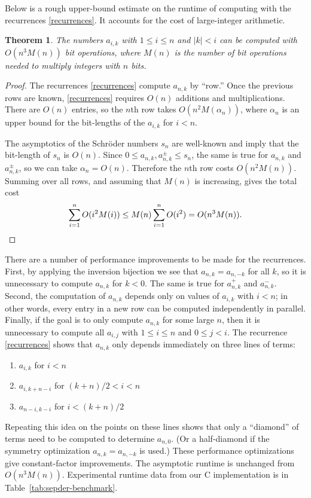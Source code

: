 \documentclass{article}
\theoremstyle{plain}
\newtheorem{theorem}{Theorem}
\theoremstyle{definition}
\theoremstyle{plain}
\begin{document}
Below is a rough upper-bound estimate on the runtime of computing with the
recurrences \eqref{recurrences}. It accounts for the cost of large-integer
arithmetic.

\begin{theorem}
    The numbers $a_{i, k}$ with $1 \leq i \leq n$ and $|k| < i$ can be computed
    with $O(n^3 M(n))$ bit operations, where $M(n)$ is the number of bit
    operations needed to multiply integers with $n$ bits.
\end{theorem}

\begin{proof}
    The recurrences \eqref{recurrences} compute $a_{n, k}$ by ``row.'' Once the
    previous rows are known, \eqref{recurrences} requires $O(n)$ additions and
    multiplications. There are $O(n)$ entries, so the $n$th row takes $O(n^2
    M(\alpha_n))$, where $\alpha_n$ is an upper bound for the
    bit-lengths of the $a_{i, k}$ for $i < n$.

    The asymptotics of the Schr\"oder numbers $s_n$ are well-known
    \cite{OEISA6318} and imply that the bit-length of $s_n$ is $O(n)$. Since $0
    \leq a_{n, k}, a^\pm_{n, k} \leq s_n$, the same is true for $a_{n, k}$ and
    $a^\pm_{n, k}$, so we can take $\alpha_n = O(n)$. Therefore the $n$th row
    costs $O(n^2 M(n))$. Summing over all rows, and assuming that $M(n)$ is
    increasing, gives the total cost
    \begin{equation*}
        \sum_{i = 1}^n O(i^2 M(i)) \leq M(n) \sum_{i = 1}^n O(i^2) = O(n^3 M(n)). \qedhere
    \end{equation*}
\end{proof}

There are a number of performance improvements to be made for the recurrences.
First, by applying the inversion bijection we see that $a_{n, k} = a_{n, -k}$ for all $k$, so it is unnecessary to compute
$a_{n, k}$ for $k < 0$. The same is true for $a^+_{n, k}$ and $a^-_{n, k}$.
Second, the computation of $a_{n, k}$ depends only on values of $a_{i, k}$ with
$i < n$; in other words, every entry in a new row can be computed independently
in parallel. Finally, if the goal is to only compute $a_{n, k}$ for some large
$n$, then it is unnecessary to compute all $a_{i, j}$ with $1 \leq i \leq n$
and $0 \leq j < i$. The recurrence \eqref{recurrences} shows that $a_{n, k}$
only depends immediately on three lines of terms:
\begin{enumerate}
    \item $a_{i, k}$ for $i < n$
    \item $a_{i, k + n - i}$ for $(k + n) / 2 < i < n$
    \item $a_{n - i, k - i}$ for $i < (k + n) / 2$
\end{enumerate}
Repeating this idea on the points on these lines shows that only a ``diamond''
of terms need to be computed to determine $a_{n, 0}$. (Or a half-diamond if the
symmetry optimization $a_{n, k} = a_{n, -k}$ is used.) These performance
optimizations give constant-factor improvements. The asymptotic runtime is
unchanged from $O(n^3 M(n))$. Experimental runtime data from our C
implementation is in Table~\ref{tab:sepder-benchmark}.
\end{document}
